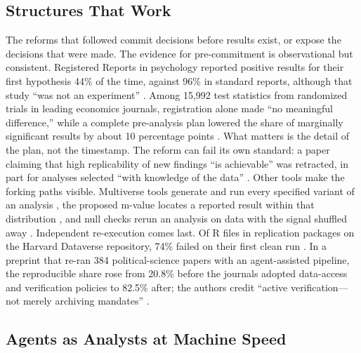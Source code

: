 \subsection{Structures That Work}

The reforms that followed commit decisions before results exist, or expose the decisions that were made. The evidence for pre-commitment is observational but consistent. Registered Reports in psychology reported positive results for their first hypothesis 44\% of the time, against 96\% in standard reports, although that study ``was not an experiment'' \citep{R13}. Among 15,992 test statistics from randomized trials in leading economics journals, registration alone made ``no meaningful difference,'' while a complete pre-analysis plan lowered the share of marginally significant results by about 10 percentage points \citep{R19}. What matters is the detail of the plan, not the timestamp. The reform can fail its own standard: a paper claiming that high replicability of new findings ``is achievable'' was retracted, in part for analyses selected ``with knowledge of the data'' \citep{R20}. Other tools make the forking paths visible. Multiverse tools generate and run every specified variant of an analysis \citep{R30}, the proposed m-value locates a reported result within that distribution \citep{R3}, and null checks rerun an analysis on data with the signal shuffled away \citep{R4}. Independent re-execution comes last. Of R files in replication packages on the Harvard Dataverse repository, 74\% failed on their first clean run \citep{R15}. In a preprint that re-ran 384 political-science papers with an agent-assisted pipeline, the reproducible share rose from 20.8\% before the journals adopted data-access and verification policies to 82.5\% after; the authors credit ``active verification---not merely archiving mandates'' \citep{R8}.

\subsection{Agents as Analysts at Machine Speed}

